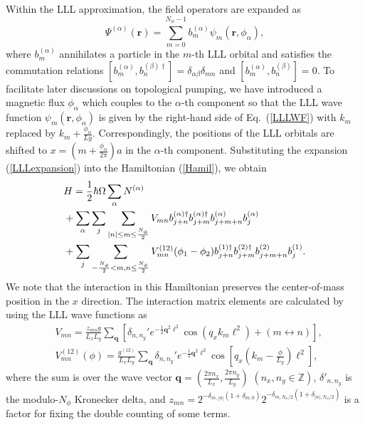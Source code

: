 \documentclass[aps,prb,twocolumn,superscriptaddress,showpacs,floatfix]{revtex4-1}
\newcommand{\bmr}{\bm{r}}
\newcommand{\bmq}{\bm{q}}
\begin{document}
Within the LLL approximation, the field operators are expanded as
\begin{equation}
\Psi^{(\alpha)}(\bmr)=\sum_{m=0}^{N_\phi-1}b^{(\alpha)}_m\psi_m(\bmr,\phi_\alpha),
\label{LLLexpansion}
\end{equation}
where $b_m^{(\alpha)}$ annihilates a particle in the $m$-th LLL orbital and satisfies the commutation relations $[b_m^{(\alpha)}, b_n^{(\beta)\dag}]=\delta_{\alpha\beta}\delta_{mn}$ and $[b_m^{(\alpha)}, b_n^{(\beta)}]=0$. 
To facilitate later discussions on topological pumping, we have introduced a magnetic flux $\phi_\alpha$ which couples to the $\alpha$-th component so that the LLL wave function $\psi_m(\bmr, \phi_\alpha)$ is given by the right-hand side of Eq.\ (\ref{LLLWF}) 
with $k_m$ replaced by $k_m+\frac{\phi_\alpha}{Ly}$. Correspondingly, the positions of the LLL orbitals are shifted to $x=(m+\frac{\phi_\alpha}{2\pi})a$ in the $\alpha$-th component. 
Substituting the expansion (\ref{LLLexpansion}) into the Hamiltonian (\ref{Hamil}), we obtain
\begin{align}
&H=\frac{1}{2}\hbar\Omega \sum_\alpha N^{(\alpha)}\notag\\
&+\sum_{\alpha}\sum_j\sum_{|n|\leq m\leq \frac{N_\phi}{2}}V_{mn}b_{j+n}^{(\alpha)\dag}b_{j+m}^{(\alpha)\dag}b_{j+m+n}^{(\alpha)}b_{j}^{(\alpha)}\notag\\
&+\sum_j\sum_{-\frac{N_\phi}{2}<m,n\leq \frac{N_\phi}{2}}V^{(12)}_{mn}(\phi_1-\phi_2)b_{j+n}^{(1)\dag}b_{j+m}^{(2)\dag}b_{j+m+n}^{(2)}b_{j}^{(1)}.\label{H_LLL}
\end{align}
We note that the interaction in this Hamiltonian preserves the center-of-mass position in the $x$ direction. 
The interaction matrix elements are calculated by using the LLL wave functions as \cite{Yoshioka,Bergholtz2}
\begin{subequations}
\begin{align}
&V_{mn}=\frac{z_{mn} g}{L_xL_y}\sum_{\bmq}\left[ \delta_{n,n_y}' e^{-\frac{1}{2}\bmq^2\ell^2}\cos(q_xk_m\ell^2)+(m\leftrightarrow n) \right],\label{V3}\\
&V^{(12)}_{mn}(\phi)=\frac{g^{(12)}}{L_xL_y}\sum_{\bmq} \delta_{n,n_y}' e^{-\frac{1}{2}\bmq^2\ell^2}\cos\left[q_x \left(k_m-\frac{\phi}{L_y}\right)\ell^2\right],\label{V3_12}
\end{align}
\end{subequations}
where the sum is over the wave vector $\bm{q}=(\frac{2\pi n_x}{L_x}, \frac{2\pi n_y}{L_y})$ $(n_x, n_y\in\mathbb{Z})$, $\delta'_{n,n_y}$ is the modulo-$N_\phi$ Kronecker delta, and $\displaystyle z_{mn}=2^{-\delta_{m,|n|}(1+\delta_{m,0})}2^{-\delta_{m,N_\phi/2}(1+\delta_{|n|,N_\phi/2})}$ is a factor for fixing the double counting of some terms. 
\end{document}
